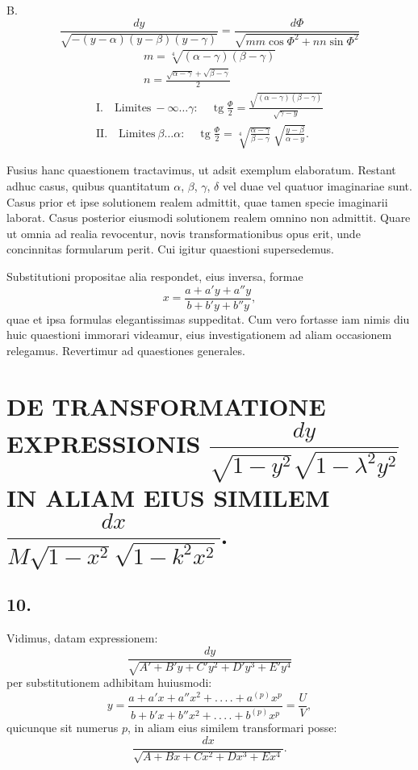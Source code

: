 \documentclass{article}
\begin{document}
B.
\[
\frac{dy}{\sqrt{-(y-\alpha)(y-\beta)(y-\gamma)}}=\frac{d\Phi}{\sqrt{mm\cos\Phi^{2}+nn\sin\Phi^{2}}}
\]
\[
\begin{gathered}
m=\sqrt[4]{(\alpha-\gamma)(\beta-\gamma)}\\
n=\frac{\sqrt{\alpha-\gamma}+\sqrt{\beta-\gamma}}{2}
\end{gathered}
\]
\[
\begin{gathered}
\text{I.}\quad\text{Limites}\ -\infty\ldots\gamma:\quad\operatorname{tg}\frac{\Phi}{2}=\frac{\sqrt{(\alpha-\gamma)(\beta-\gamma)}}{\sqrt{\gamma-y}}\\
\text{II.}\quad\text{Limites}\ \beta\ldots\alpha:\quad\operatorname{tg}\frac{\Phi}{2}=\sqrt[4]{\frac{\alpha-\gamma}{\beta-\gamma}}\ \sqrt{\frac{y-\beta}{\alpha-y}}.
\end{gathered}
\]


Fusius hanc quaestionem tractavimus, ut adsit exemplum elaboratum. Restant adhuc casus, quibus quantitatum $\alpha$, $\beta$, $\gamma$, $\delta$ vel duae vel quatuor imaginariae sunt. Casus prior et ipse solutionem realem admittit, quae tamen specie imaginarii laborat. Casus posterior eiusmodi solutionem realem omnino non admittit. Quare ut omnia ad realia revocentur, novis transformationibus opus erit, unde concinnitas formularum perit. Cui igitur quaestioni supersedemus.

Substitutioni propositae alia respondet, eius inversa, formae
\[
x=\frac{a+a'y+a''y}{b+b'y+b''y},
\]
quae et ipsa formulas elegantissimas suppeditat. Cum vero fortasse iam nimis diu huic quaestioni immorari videamur, eius investigationem ad aliam occasionem relegamus. Revertimur ad quaestiones generales.

\section*{DE TRANSFORMATIONE EXPRESSIONIS $\dfrac{dy}{\sqrt{1-y^{2}}\sqrt{1-\lambda^{2}y^{2}}}$ IN ALIAM EIUS SIMILEM $\dfrac{dx}{M\sqrt{1-x^{2}}\sqrt{1-k^{2}x^{2}}}$.}

\subsection*{10.}

Vidimus, datam expressionem:
\[
\frac{dy}{\sqrt{A'+B'y+C'y^{2}+D'y^{3}+E'y^{4}}}
\]
per substitutionem adhibitam huiusmodi:
\[
y=\frac{a+a'x+a''x^{2}+.\,.\,.\,.+a^{(p)}x^{p}}{b+b'x+b''x^{2}+.\,.\,.\,.+b^{(p)}x^{p}}=\frac{U}{V},
\]
quicunque sit numerus $p$, in aliam eius similem transformari posse:
\[
\frac{dx}{\sqrt{A+Bx+Cx^{2}+Dx^{3}+Ex^{4}}}.
\]
\end{document}
